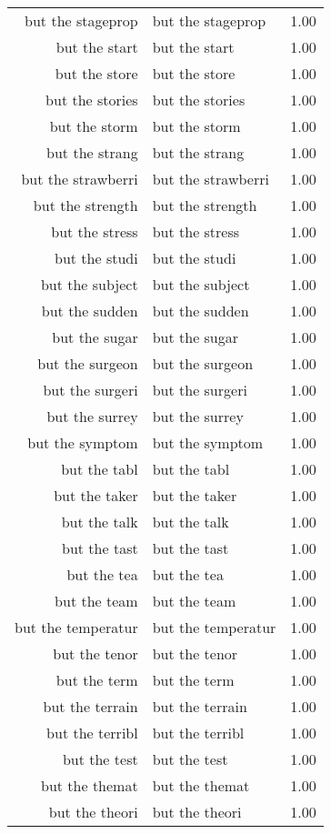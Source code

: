 \begin{table}[ht]
\begin{tabular}{rlr}
  but the stageprop & but the stageprop & 1.00 \\ 
  but the start & but the start & 1.00 \\ 
  but the store & but the store & 1.00 \\ 
  but the stories & but the stories & 1.00 \\ 
  but the storm & but the storm & 1.00 \\ 
  but the strang & but the strang & 1.00 \\ 
  but the strawberri & but the strawberri & 1.00 \\ 
  but the strength & but the strength & 1.00 \\ 
  but the stress & but the stress & 1.00 \\ 
  but the studi & but the studi & 1.00 \\ 
  but the subject & but the subject & 1.00 \\ 
  but the sudden & but the sudden & 1.00 \\ 
  but the sugar & but the sugar & 1.00 \\ 
  but the surgeon & but the surgeon & 1.00 \\ 
  but the surgeri & but the surgeri & 1.00 \\ 
  but the surrey & but the surrey & 1.00 \\ 
  but the symptom & but the symptom & 1.00 \\ 
  but the tabl & but the tabl & 1.00 \\ 
  but the taker & but the taker & 1.00 \\ 
  but the talk & but the talk & 1.00 \\ 
  but the tast & but the tast & 1.00 \\ 
  but the tea & but the tea & 1.00 \\ 
  but the team & but the team & 1.00 \\ 
  but the temperatur & but the temperatur & 1.00 \\ 
  but the tenor & but the tenor & 1.00 \\ 
  but the term & but the term & 1.00 \\ 
  but the terrain & but the terrain & 1.00 \\ 
  but the terribl & but the terribl & 1.00 \\ 
  but the test & but the test & 1.00 \\ 
  but the themat & but the themat & 1.00 \\ 
  but the theori & but the theori & 1.00 \\ 

\end{tabular}
\end{table}

